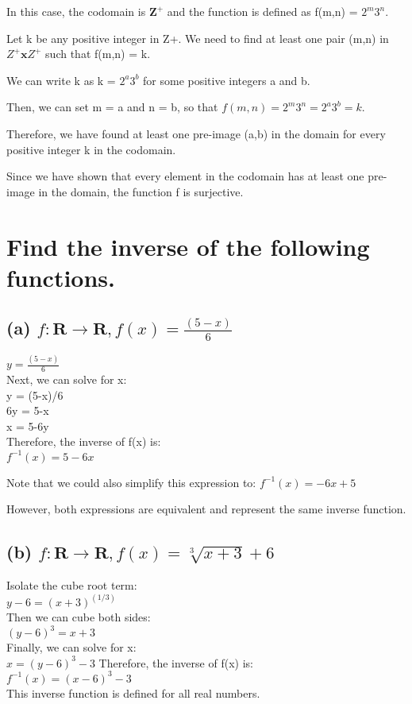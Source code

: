 \documentclass{article}
\begin{document}
In this case, the codomain is $\mathbf{Z^+}$ and the function is defined as f(m,n) = $2^m3^n.$

Let k be any positive integer in Z+. We need to find at least one pair (m,n) in $Z^+ \textbf{x} Z^+$ such that f(m,n) = k.

We can write k as k = $2^a3^b$ for some positive integers a and b.

Then, we can set m = a and n = b, so that $f(m,n) = 2^m3^n = 2^a3^b = k.$

Therefore, we have found at least one pre-image (a,b) in the domain for every positive integer k in the codomain.

Since we have shown that every element in the codomain has at least one pre-image in the domain, the function f is surjective.

\section{Find the inverse of the following functions.}
\subsection{(a) $f:\mathbf{R} \rightarrow \mathbf{R}, f(x) = \frac{(5-x)}{6}$}
$y = \frac{(5-x)}{6}$\\
Next, we can solve for x:\\

y = (5-x)/6\\

6y = 5-x\\

x = 5-6y\\

Therefore, the inverse of f(x) is:\\
$f^{-1}(x) = 5-6x$

Note that we could also simplify this expression to:
$f^{-1}(x) = -6x + 5$

However, both expressions are equivalent and represent the same inverse function.\\
\subsection{(b) $f:\mathbf{R} \rightarrow \mathbf{R}, f(x) = \sqrt[3]{x+3} + 6$}
Isolate the cube root term:\\
$y - 6 = (x+3)^(1/3)$\\
Then we can cube both sides:\\
$(y - 6)^3 = x+3$\\
Finally, we can solve for x:\\
$x = (y - 6)^3 - 3$
Therefore, the inverse of f(x) is:\\
$f^{-1}(x) = (x - 6)^3 - 3$\\
This inverse function is defined for all real numbers.\\
\end{document}
